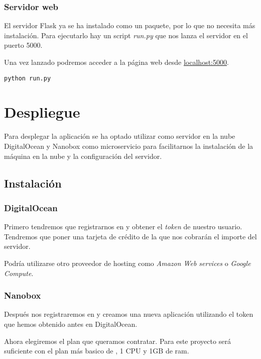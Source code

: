 \subsubsection{Servidor web}

El servidor Flask ya se ha instalado como un paquete, por lo que no necesita más instalación.
Para ejecutarlo hay un script \textit{run.py} que nos lanza el servidor en el puerto 5000.

Una vez lanzado podremos acceder a la página web desde \href{http://localhost:5000}{localhost:5000}.

\begin{lstlisting}
python run.py
\end{lstlisting}

\section{Despliegue}

Para desplegar la aplicación se ha optado utilizar como servidor en la nube DigitalOcean y Nanobox como microservicio para facilitarnos la instalación de la máquina en la nube y la configuración del servidor.

\subsection{Instalación}

\subsubsection{DigitalOcean}

Primero tendremos que registrarnos en  y obtener el \textit{token} de nuestro usuario. Tendremos que poner una tarjeta de crédito de la que nos cobrarán el importe del servidor.

Podría utilizarse otro proveedor de hosting como \textit{Amazon Web services} o \textit{Google Compute}.

\subsubsection{Nanobox}

Después nos registraremos en  y creamos una nueva aplicación utilizando el token que hemos obtenido antes en DigitalOcean.

Ahora elegiremos el plan que queramos contratar. Para este proyecto será suficiente con el plan más basico de , 1 CPU y 1GB de ram.

